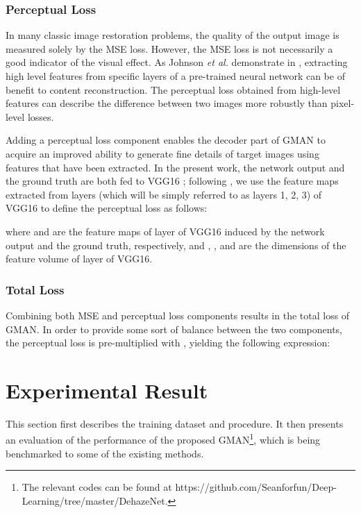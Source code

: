 \documentclass[journal]{IEEEtran}
\begin{document}
\subsubsection{Perceptual Loss}

In many classic image restoration problems, the quality of the output image is measured solely by the MSE loss. However, the MSE loss is not necessarily a good indicator of the visual effect. As Johnson \textit{et al.} demonstrate in \cite{johnson2016perceptual}, extracting high level features from specific layers of a pre-trained neural network can be of benefit to content reconstruction. The perceptual loss obtained from high-level features can describe the difference between two images more robustly than pixel-level losses.

Adding a perceptual loss component enables the decoder part of GMAN to acquire an improved ability to generate fine details of target images using features that have been extracted. In the present work, the network output and the ground truth are both fed to VGG16 \cite{VGG16}; following \cite{johnson2016perceptual}, we use the feature maps extracted from layers \textit{} (which will be simply referred to as layers 1, 2, 3) of VGG16 to define the perceptual loss  as follows:

where  and  are the feature maps of  layer  of VGG16 induced by the network output and the ground truth, respectively, and , , and  are the dimensions of the feature volume of layer  of VGG16.
 



\subsubsection{Total Loss}
Combining both MSE and perceptual loss components results in the total loss of GMAN. In order to provide some sort of balance between the two components, the perceptual loss is pre-multiplied with , yielding the following expression:



\section{Experimental Result}

This section first describes the training dataset and procedure. It then presents an evaluation of the performance of the proposed GMAN\footnote{The relevant codes can be found at https://github.com/Seanforfun/Deep-Learning/tree/master/DehazeNet.}, which is being benchmarked to some of the existing methods.
\end{document}
